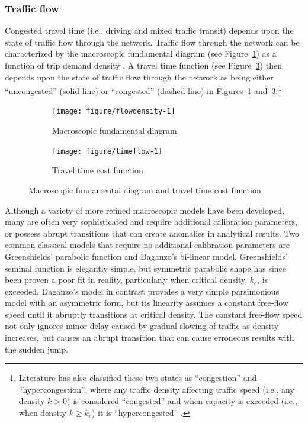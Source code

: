 \documentclass{elsarticle}\usepackage[]{graphicx}\usepackage[]{color}
\newenvironment{knitrout}{}{} %
\begin{document}
\subsubsection{Traffic flow}
Congested travel time (i.e., driving and mixed traffic transit) depends upon the state of traffic flow through the network. Traffic flow through the network can be characterized by the macroscopic fundamental diagram (see Figure~\ref{fig:mfd}) as a function of trip demand density \citep{Daganzo2008, Geroliminis2008, Liu2016, Haddad2014}. A travel time function (see Figure~\ref{fig:traveltime}) then depends upon the state of traffic flow through the network as being either ``uncongested'' (solid line) or ``congested'' (dashed line) in Figures~\ref{fig:mfd} and~\ref{fig:traveltime}.\footnote{Literature has also classified these two states as ``congestion'' and ``hypercongestion'', where any traffic density affecting traffic speed (i.e., any density $k>0$) is considered ``congested'' and when capacity is exceeded (i.e., when density $k \geq k_c$) it is ``hypercongested'' \citep{Gonzales2015,Small2003}.}

\begin{figure}[H]
     \centering
     \hfill
     \begin{subfigure}[b]{0.45\textwidth}
         \centering
\begin{knitrout}
\color{fgcolor}
\texttt{[image: figure/flowdensity-1]} 
\end{knitrout}
         \caption{Macroscopic fundamental diagram}
         \label{fig:mfd}
     \end{subfigure}
     \hfill
     \begin{subfigure}[b]{0.45\textwidth}
         \centering
\begin{knitrout}
\color{fgcolor}
\texttt{[image: figure/timeflow-1]} 
\end{knitrout}
         \caption{Travel time cost function}
         \label{fig:traveltime}
     \end{subfigure}
     \hfill
     \caption{Macroscopic fundamental diagram and travel time cost function}
\end{figure}

Although a variety of more refined macroscopic models have been developed, many are often very sophisticated and require additional calibration parameters, or possess abrupt transitions that can create anomalies in analytical results. Two common classical models that require no additional calibration parameters are Greenshields' \citep{Greenshields1935} parabolic function and Daganzo's \citep{Daganzo1997} bi-linear model. Greenshields' seminal function is elegantly simple, but symmetric parabolic shape has since been proven a poor fit in reality, particularly when critical density, $k_c$, is exceeded. Daganzo's model in contrast provides a very simple parsimonious model with an asymmetric form, but its linearity assumes a constant free-flow speed until it abruptly transitions at critical density. The constant free-flow speed not only ignores minor delay caused by gradual slowing of traffic as density increases, but causes an abrupt transition that can cause erroneous results with the sudden jump. 
\end{document}

